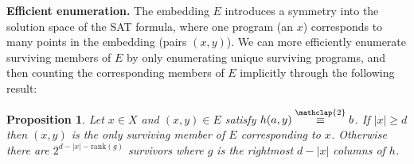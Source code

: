 \documentclass{article}
\newtheorem{proposition}{Proposition}
\newcommand\modt{\stackrel{\mathclap{\normalfont 2}}{\equiv}}
\begin{document}
  

  \textbf{Efficient enumeration.} The embedding $E$ introduces a symmetry into the solution space of the SAT formula, where one program (an $x$) corresponds to many points in the embedding (pairs $(x,y)$).
  We can more efficiently enumerate surviving members of $E$ by only enumerating unique surviving programs,
  and then counting the corresponding members of $E$ implicitly through the following result:
  \begin{proposition}\label{ranktheorem}
    Let $x\in X$ and $(x,y)\in E $ satisfy $h(a,y) \modt b$.  If $\lvert x \rvert  \geq d$ then $(x,y)$ is the only surviving member of $E$ corresponding to $x$. Otherwise there are $2^{d - \lvert x \rvert  - \text{rank}(g)}$ survivors where $g$ is the rightmost $d - \lvert x \rvert $ columns of $h$.
  \end{proposition}
\end{document}
